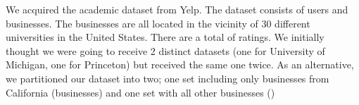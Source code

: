 
We acquired the academic dataset from Yelp\cite{yelp}. The dataset consists of
\numUserTotal users and \numBusTotal businesses. The businesses are all located
in the vicinity of $30$ different universities in the United States. There are
a total of \numRatingTotal ratings. We initially thought we were going to receive 2 distinct datasets (one for University of Michigan,
 one for Princeton) but received the same one twice.
As an alternative, we partitioned our dataset into two; one set
including only businesses from California (\numBusCA businesses) and one set with all other
businesses (\numBusOthernsp)






